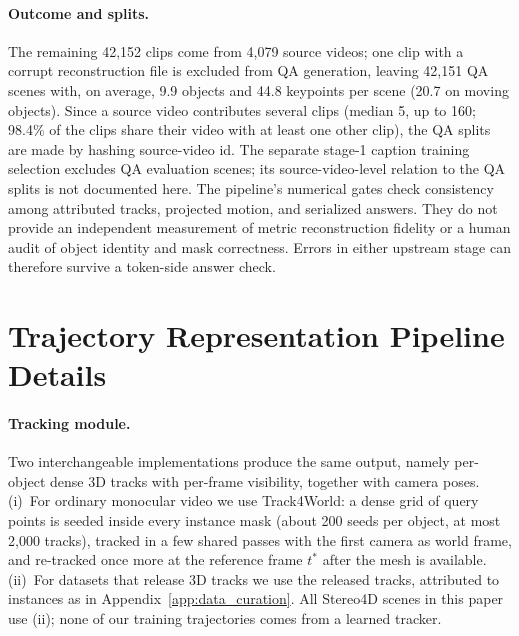 \paragraph{Outcome and splits.}
The remaining 42,152 clips come from 4,079 source videos; one clip with a corrupt reconstruction file is excluded from QA generation, leaving 42,151 QA scenes with, on average, 9.9 objects and 44.8 keypoints per scene (20.7 on moving objects).
Since a source video contributes several clips (median 5, up to 160; 98.4\% of the clips share their video with at least one other clip), the QA splits are made by hashing source-video id. The separate stage-1 caption training selection excludes QA evaluation scenes; its source-video-level relation to the QA splits is not documented here.
The pipeline's numerical gates check consistency among attributed tracks, projected motion, and serialized answers. They do not provide an independent measurement of metric reconstruction fidelity or a human audit of object identity and mask correctness. Errors in either upstream stage can therefore survive a token-side answer check.

\section{Trajectory Representation Pipeline Details}
\label{app:pipeline}

\paragraph{Tracking module.}
Two interchangeable implementations produce the same output, namely per-object dense 3D tracks with per-frame visibility, together with camera poses.
(i)~For ordinary monocular video we use Track4World: a dense grid of query points is seeded inside every instance mask (about 200 seeds per object, at most 2,000 tracks), tracked in a few shared passes with the first camera as world frame, and re-tracked once more at the reference frame $t^\ast$ after the mesh is available.
(ii)~For datasets that release 3D tracks we use the released tracks, attributed to instances as in Appendix~\ref{app:data_curation}.
All Stereo4D scenes in this paper use (ii); none of our training trajectories comes from a learned tracker.


